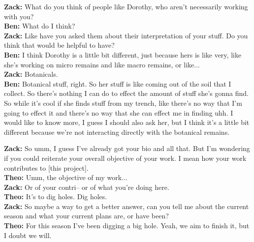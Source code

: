 \begin{arefs}
\item\label{A15}
\textbf{Zack:} What do you think of people like Dorothy, who aren't necessarily working with you?\\
\textbf{Ben:} What do I think?\\
\textbf{Zack:} Like have you asked them about their interpretation of your stuff. Do you think that would be helpful to have?\\
\textbf{Ben:} I think Dorothy is a little bit different, just because hers is like very, like she's working on micro remains and like macro remains, or like...\\
\textbf{Zack:} Botanicals.\\
\textbf{Ben:} Botanical stuff, right. So her stuff is like coming out of the soil that I collect. So there's nothing I can do to effect the amount of stuff she's gonna find. So while it's cool if she finds stuff from my trench, like there's no way that I'm going to effect it and there's no way that she can effect me in finding uhh. I would like to know more, I guess I should also ask her, but I think it's a little bit different because we're not interacting directly with the botanical remains.

\item\label{A16}
\textbf{Zack:} So umm, I guess I've already got your bio and all that. But I'm wondering if you could reiterate your overall objective of your work. I mean how your work contributes to [this project].\\
\textbf{Theo:} Umm, the objective of my work...\\
\textbf{Zack:} Or of your contri-- or of what you're doing here.\\
\textbf{Theo:} It's to dig holes. Dig holes.\\
\textbf{Zack:} So maybe a way to get a better answer, can you tell me about the current season and what your current plans are, or have been?\\
\textbf{Theo:} For this season I've been digging a big hole. Yeah, we aim to finish it, but I doubt we will.



\end{arefs}
